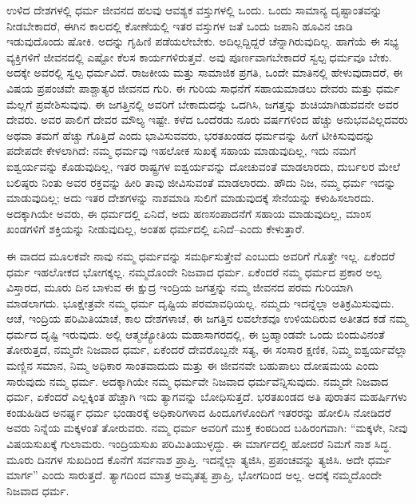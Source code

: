 ಉಳಿದ ದೇಶಗಳಲ್ಲಿ ಧರ್ಮ ಜೀವನದ ಹಲವು ಆವಶ್ಯಕ ವಸ್ತುಗಳಲ್ಲಿ ಒಂದು. ಒಂದು ಸಾಮಾನ್ಯ ದೃಷ್ಟಾಂತವನ್ನು ನೀಡಬೇಕಾದರೆ, ಈಗಿನ ಕಾಲದಲ್ಲಿ ಕೋಣೆಯಲ್ಲಿ ಇತರ ವಸ್ತುಗಳ ಜತೆ ಒಂದು ಜಪಾನಿ ಹೂವಿನ ಜಾಡಿ ಇಡುವುದೊಂದು ಷೋಕಿ. ಅದನ್ನು ಗೃಹಿಣಿ ಪಡೆಯಲೇಬೇಕು. ಅದಿಲ್ಲದ್ದಿದ್ದರೆ ಚೆನ್ನಾಗಿರುವುದಿಲ್ಲ. ಹಾಗೆಯೆ ಈ ಸಭ್ಯ ವ್ಯಕ್ತಿಗಳಿಗೆ ಜೀವನದಲ್ಲಿ ಎಷ್ಟೋ ಕೆಲಸ ಕಾರ್ಯಗಳಿರುತ್ತವೆ. ಅವು ಪೂರ್ಣವಾಗಬೇಕಾದರೆ ಸ್ವಲ್ಪ ಧರ್ಮವೂ ಬೇಕು. ಅದಕ್ಕೇ ಅವರಲ್ಲಿ ಸ್ವಲ್ಪ ಧರ್ಮವಿದೆ. ರಾಜಕೀಯ ಮತ್ತು ಸಾಮಾಜಿಕ ಪ್ರಗತಿ, ಒಂದೇ ಮಾತಿನಲ್ಲಿ ಹೇಳುವುದಾದರೆ, ಈ ವಿಷಯ ಪ್ರಪಂಚವೇ ಪಾಶ್ಚಾತ್ಯರ ಜೀವನದ ಗುರಿ. ಈ ಗುರಿಯ ಸಾಧನೆಗೆ ಸಹಾಯಮಾಡಲು ದೇವರು ಮತ್ತು ಧರ್ಮ ಮೆಲ್ಲಗೆ ಪ್ರವೇಶಿಸುವುವು. ಈ ಜಗತ್ತಿನಲ್ಲಿ ಅವರಿಗೆ ಬೇಕಾದುದನ್ನು ಒದಗಿಸಿ, ಜಗತ್ತನ್ನು ಶುಚಿಯಾಗಿಡುವವನೇ ಅವರ ದೇವರು. ಅವರ ಪಾಲಿಗೆ ದೇವರ ಮೌಲ್ಯ ಇಷ್ಟೇ. ಕಳೆದ ಒಂದೆರಡು ನೂರು ವರ್ಷಗಳಿಂದ ಹೆಚ್ಚು ಅನುಭವವಿಲ್ಲದವರು ಅಥವಾ ತಮಗೆ ಹೆಚ್ಚು ಗೊತ್ತಿದೆ ಎಂದು ಭಾವಿಸುವವರು, ಭರತಖಂಡದ ಧರ್ಮವನ್ನು ಹೀಗೆ ಟೀಕಿಸುವುದನ್ನು ಪದೇಪದೇ ಕೇಳಲಾಗಿದೆ: ನಮ್ಮ ಧರ್ಮವು ಇಹಲೋಕ ಸುಖಕ್ಕೆ ಸಹಾಯ ಮಾಡುವುದಿಲ್ಲ, ಇದು ನಮಗೆ ಐಶ್ವರ್ಯವನ್ನು ಕೊಡುವುದಿಲ್ಲ, ಇತರ ರಾಷ್ಟ್ರಗಳ ಐಶ್ವರ್ಯವನ್ನು ದೋಚುವಂತೆ ಮಾಡಲಾರದು, ದುರ್ಬಲರ ಮೇಲೆ ಬಲಿಷ್ಠರು ನಿಂತು ಅವರ ರಕ್ತವನ್ನು ಹೀರಿ ತಾವು ಜೀವಿಸುವಂತೆ ಮಾಡಲಾರದು. ಹೌದು ನಿಜ, ನಮ್ಮ ಧರ್ಮ ಇದನ್ನು ಮಾಡುವುದಿಲ್ಲ; ಅದು ಇತರ ದೇಶಗಳನ್ನು ನಾಶಮಾಡಿ ಸುಲಿಗೆ ಮಾಡುವುದಕ್ಕೆ ಸೇನೆಯನ್ನು ಕಳುಹಿಸಲಾರದು. ಅದಕ್ಕಾಗಿಯೇ ಅವರು, ಈ ಧರ್ಮದಲ್ಲಿ ಏನಿದೆ, ಅದು ಹಣಸಂಪಾದನೆಗೆ ಸಹಾಯ ಮಾಡುವುದಿಲ್ಲ, ಮಾಂಸ ಖಂಡಗಳಿಗೆ ಶಕ್ತಿಯನ್ನು ನೀಡುವುದಿಲ್ಲ, ಅಂತಹ ಧರ್ಮದಲ್ಲಿ ಏನಿದೆ–ಎಂದು ಕೇಳುತ್ತಾರೆ. 

ಈ ವಾದದ ಮೂಲಕವೇ ನಾವು ನಮ್ಮ ಧರ್ಮವನ್ನು ಸಮರ್ಥಿಸುತ್ತೇವೆ ಎಂಬುದು ಅವರಿಗೆ ಗೊತ್ತೇ ಇಲ್ಲ. ಏಕೆಂದರೆ ಧರ್ಮ ಇಹಲೋಕದ ಭೋಗಕ್ಕಲ್ಲ. ನಮ್ಮದೊಂದೇ ನಿಜವಾದ ಧರ್ಮ. ಏಕೆಂದರೆ ನಮ್ಮ ಧರ್ಮದ ಪ್ರಕಾರ ಅಲ್ಪ ವಿಸ್ತಾರದ, ಮೂರು ದಿನ ಬಾಳುವ ಈ ಕ್ಷುದ್ರ ಇಂದ್ರಿಯ ಜಗತ್ತನ್ನು ನಮ್ಮ ಜೀವನದ ಪರಮ ಗುರಿಯಾಗಿ ಮಾಡಲಾಗದು. ಭೂಕ್ಷೇತ್ರವೇ ನಮ್ಮ ಧರ್ಮ ದೃಷ್ಟಿಯ ಪರಮಾವಧಿಯಲ್ಲ. ನಮ್ಮದು ಇದನ್ನೆಲ್ಲಾ ಅತಿಕ್ರಮಿಸುವುದು. ಆಚೆ, ಇಂದ್ರಿಯ ಪರಿಮಿತಿಯಾಚೆ, ಕಾಲ ದೇಶಗಳಾಚೆ, ಈ ಜಗತ್ತಿನ ಲವಲೇಶವೂ ಉಳಿಯದಿರುವ ಅತೀತದ ಕಡೆ ನಮ್ಮ ಧರ್ಮದ ದೃಷ್ಟಿ ಇರುವುದು. ಅಲ್ಲಿ ಆತ್ಮಜ್ಯೋತಿಯ ಮಹಾಸಾಗರದಲ್ಲಿ, ಈ ಬ್ರಹ್ಮಾಂಡವೇ ಒಂದು ಬಿಂದುವಿನಂತೆ ತೋರುತ್ತದೆ, ನಮ್ಮದೇ ನಿಜವಾದ ಧರ್ಮ, ಏಕೆಂದರೆ ದೇವರೊಬ್ಬನೇ ಸತ್ಯ, ಈ ಸಂಸಾರ ಕ್ಷಣಿಕ, ನಿಮ್ಮ ಐಶ್ವರ್ಯವೆಲ್ಲಾ ಮಣ್ಣಿನ ಸಮಾನ, ನಿಮ್ಮ ಅಧಿಕಾರ ಸಾಂತವಾದುದು ಮತ್ತು ಈ ಜೀವನವೇ ಬಹುಪಾಲು ದೋಷಮಯ ಎಂದು ಸಾರುವುದು ನಮ್ಮ ಧರ್ಮ. ಅದಕ್ಕಾಗಿಯೇ ನಮ್ಮ ಧರ್ಮವೇ ನಿಜವಾದ ಧರ್ಮವೆನ್ನಿಸುವುದು. ನಮ್ಮದೇ ನಿಜವಾದ ಧರ್ಮ, ಏಕೆಂದರೆ ಎಲ್ಲಕ್ಕಿಂತ ಹೆಚ್ಚಾಗಿ ಇದು ತ್ಯಾಗವನ್ನು ಬೋಧಿಸುತ್ತದೆ. ಭರತಖಂಡದ ಅತಿ ಪುರಾತನ ಮಹರ್ಷಿಗಳು ಕಂಡುಹಿಡಿದ ಅನರ್ಘ್ಯ ಧರ್ಮ ಭಂಡಾರಕ್ಕೆ ಅಧಿಕಾರಿಗಳಾದ ಹಿಂದೂಗಳೊಂದಿಗೆ ಇತರರನ್ನು ಹೋಲಿಸಿ ನೋಡಿದರೆ ಅವರು ನಿನ್ನೆಯ ಮಕ್ಕಳಂತೆ ತೋರುವರು. ನಮ್ಮ ಧರ್ಮ ಅವರಿಗೆ ಮುಕ್ತ ಕಂಠದಿಂದ ಬಹಿರಂಗವಾಗಿ: “ಮಕ್ಕಳೇ, ನೀವು ವಿಷಯಸುಖಕ್ಕೆ ಗುಲಾಮರು. ಇಂದ್ರಿಯಸುಖ ಪರಿಮಿತಿಯುಳ್ಳದ್ದು. ಈ ಮಾರ್ಗದಲ್ಲಿ ಹೋದರೆ ನಿಮಗೆ ನಾಶ ಸಿದ್ಧ. ಮೂರು ದಿನಗಳ ಸುಖದಿಂದ ಕೊನೆಗೆ ಸರ್ವನಾಶ ಪ್ರಾಪ್ತಿ. ಇದನ್ನೆಲ್ಲಾ ತ್ಯಜಿಸಿ, ಪ್ರಪಂಚವನ್ನು ತ್ಯಜಿಸಿ. ಅದೇ ಧರ್ಮ ಮಾರ್ಗ” ಎಂದು ಸಾರುತ್ತದೆ. ತ್ಯಾಗದಿಂದ ಮಾತ್ರ ಅಮೃತತ್ವ ಪ್ರಾಪ್ತಿ, ಭೋಗದಿಂದ ಅಲ್ಲ. ಅದಕ್ಕೆ ನಮ್ಮದೊಂದೇ ನಿಜವಾದ ಧರ್ಮ. 

